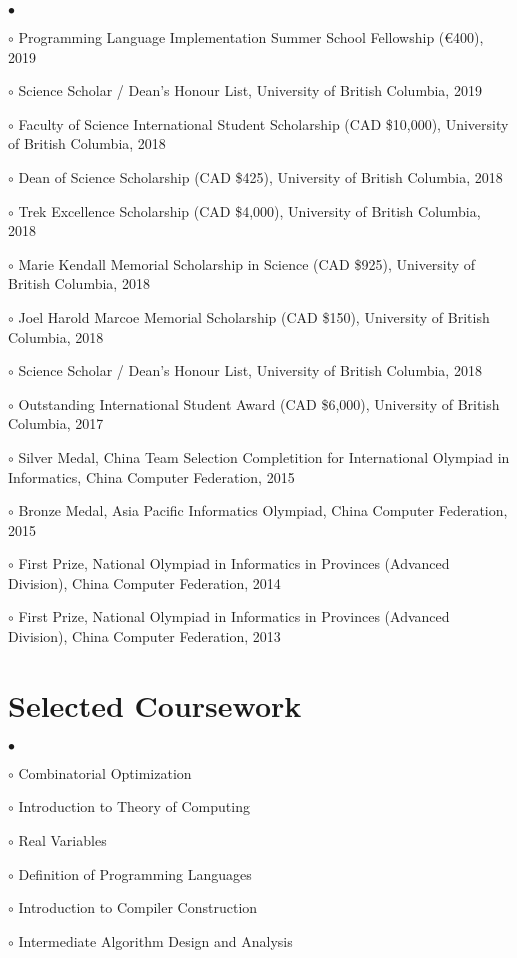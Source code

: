 \documentclass[margin,line]{res}
\newenvironment{list2}{
  \begin{list}{$\bullet$}{%
      \setlength{\itemsep}{0in}
      \setlength{\parsep}{0in} \setlength{\parskip}{0in}
      \setlength{\topsep}{0in} \setlength{\partopsep}{0in}
      \setlength{\leftmargin}{0.2in}}}{\end{list}}
\begin{document}
\begin{resume}
\begin{list2}
\item[$\circ$] Programming Language Implementation Summer School Fellowship (€400), 2019
\item[$\circ$] Science Scholar / Dean's Honour List, University of British Columbia, 2019
\item[$\circ$] Faculty of Science International Student Scholarship (CAD \$10,000), University of British Columbia, 2018
\item[$\circ$] Dean of Science Scholarship (CAD \$425), University of British Columbia, 2018
\item[$\circ$] Trek Excellence Scholarship (CAD \$4,000), University of British Columbia, 2018
\item[$\circ$] Marie Kendall Memorial Scholarship in Science (CAD \$925), University of British Columbia, 2018
\item[$\circ$] Joel Harold Marcoe Memorial Scholarship (CAD \$150), University of British Columbia, 2018
\item[$\circ$] Science Scholar / Dean's Honour List, University of British Columbia, 2018 
\item[$\circ$] Outstanding International Student Award (CAD \$6,000), University of British Columbia, 2017
\item[$\circ$] Silver Medal, China Team Selection Completition for International Olympiad in Informatics, China Computer Federation, 2015
\item[$\circ$] Bronze Medal, Asia Pacific Informatics Olympiad, China Computer Federation, 2015
\item[$\circ$] First Prize, National Olympiad in Informatics in Provinces (Advanced Division), China Computer Federation, 2014
\item[$\circ$] First Prize, National Olympiad in Informatics in Provinces (Advanced Division), China Computer Federation, 2013
\end{list2}


\section{\sc Selected Coursework}

\begin{list2}
\item[$\circ$] Combinatorial Optimization
\item[$\circ$] Introduction to Theory of Computing  
\item[$\circ$] Real Variables
\item[$\circ$] Definition of Programming Languages
\item[$\circ$] Introduction to Compiler Construction
\item[$\circ$] Intermediate Algorithm Design and Analysis 
\end{list2}



\end{resume}
\end{document}
